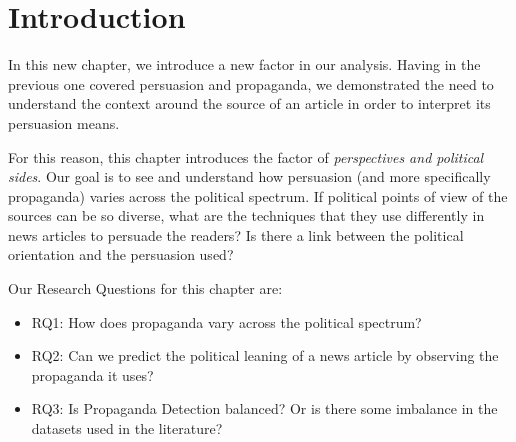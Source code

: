 \label{chap:political_sides}

\section{\statusorange Introduction}


In this new chapter, we introduce a new factor in our analysis.
Having in the previous one covered persuasion and propaganda, we demonstrated the need to understand the context around the source of an article in order to interpret its persuasion means.

For this reason, this chapter introduces the factor of \emph{perspectives and political sides}.
Our goal is to see and understand how persuasion (and more specifically propaganda) varies across the political spectrum. If political points of view of the sources can be so diverse, what are the techniques that they use differently in news articles to persuade the readers? Is there a link between the political orientation and the persuasion used?


Our Research Questions for this chapter are:
\begin{itemize}
    \item RQ1: How does propaganda vary across the political spectrum?
    \item RQ2: Can we predict the political leaning of a news article by observing the propaganda it uses?
    \item RQ3: Is Propaganda Detection balanced? Or is there some imbalance in the datasets used in the literature?
\end{itemize}


